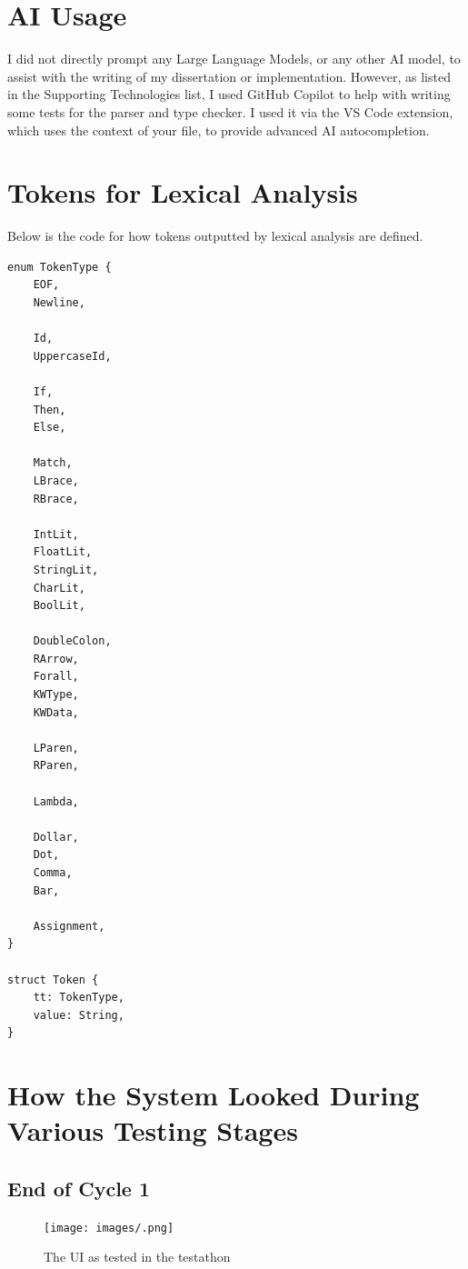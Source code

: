 
\appendix

\chapter{AI Usage}
\label{appx:ai_prompt}

I did not directly prompt any Large Language Models, or any other AI model, to assist with the writing of my dissertation or implementation. However, as listed in the Supporting Technologies list, I used GitHub Copilot to help with writing some tests for the parser and type checker. I used it via the VS Code extension, which uses the context of your file, to provide advanced AI autocompletion.


\chapter{Tokens for Lexical Analysis}
\label{appx:tokens}
Below is the code for how tokens outputted by lexical analysis are defined. 
\begin{lstlisting}
enum TokenType {
    EOF,
    Newline,

    Id,
    UppercaseId,

    If,
    Then,
    Else,

    Match,
    LBrace,
    RBrace,

    IntLit,
    FloatLit,
    StringLit,
    CharLit,
    BoolLit,

    DoubleColon,
    RArrow,
    Forall,
    KWType,
    KWData,

    LParen,
    RParen,

    Lambda,

    Dollar,
    Dot,
    Comma,
    Bar,

    Assignment,
}

struct Token {
    tt: TokenType,
    value: String,
}
\end{lstlisting}

\chapter{How the System Looked During Various Testing Stages}
\section{End of Cycle 1}
\begin{figure}[h]
    \centering
    \texttt{[image: images/.png]}
    \caption{The UI as tested in the testathon}
    \label{fig:screenshot_testathon}
\end{figure}

